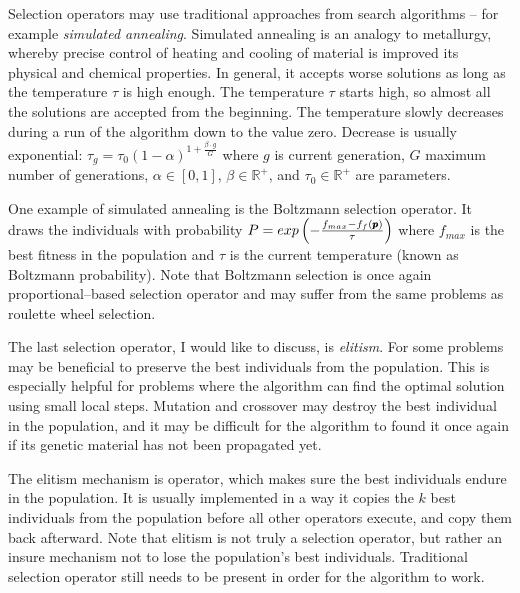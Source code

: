 Selection operators may use traditional approaches from search algorithms -- for example \emph{simulated annealing}. Simulated annealing is an analogy to metallurgy, whereby precise control of heating and cooling of material is improved its physical and chemical properties. In general, it accepts worse solutions as long as the temperature $\tau$ is high enough. The temperature $\tau$ starts high, so almost all the solutions are accepted from the beginning. The temperature slowly decreases during a run of the algorithm down to the value zero. Decrease is usually exponential: $\tau_g=\tau_0(1-\alpha)^{1+\frac{\beta\cdot g}{G}}$ where $g$ is current generation, $G$ maximum number of generations, $\alpha\in\left[0,1\right]$, $\beta\in\mathbb{R}^+$, and $\tau_0\in\mathbb{R}^+$ are parameters. 

One example of simulated annealing is the Boltzmann selection operator. It draws the individuals with probability 
$P=exp\left(-\frac{f_{max} - f_f(\pmb{p})}{\tau}\right)$
where $f_{max}$ is the best fitness in the population and $\tau$ is the current temperature (known as Boltzmann probability). Note that Boltzmann selection is once again proportional--based selection operator and may suffer from the same problems as roulette wheel selection.

The last selection operator, I would like to discuss, is \emph{elitism}. For some problems may be beneficial to preserve the best individuals from the population. This is especially helpful for problems where the algorithm can find the optimal solution using small local steps. Mutation and crossover may destroy the best individual in the population, and it may be difficult for the algorithm to found it once again if its genetic material has not been propagated yet.

The elitism mechanism is operator, which makes sure the best individuals endure in the population. It is usually implemented in a way it copies the $k$ best individuals from the population before all other operators execute, and copy them back afterward. Note that elitism is not truly a selection operator, but rather an insure mechanism not to lose the population's best individuals. Traditional selection operator still needs to be present in order for the algorithm to work. 





